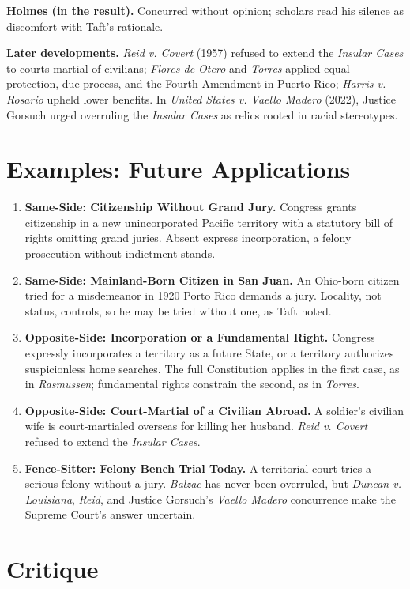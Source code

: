 \documentclass[12pt]{article}
\begin{document}
\textbf{Holmes (in the result).} Concurred without opinion; scholars read his silence as discomfort with Taft's rationale.

\textbf{Later developments.} \textit{Reid v. Covert} (1957) refused to extend the \textit{Insular Cases} to courts-martial of civilians; \textit{Flores de Otero} and \textit{Torres} applied equal protection, due process, and the Fourth Amendment in Puerto Rico; \textit{Harris v. Rosario} upheld lower benefits. In \textit{United States v. Vaello Madero} (2022), Justice Gorsuch urged overruling the \textit{Insular Cases} as relics rooted in racial stereotypes.

\section{Examples: Future Applications}

\begin{enumerate}
\item \textbf{Same-Side: Citizenship Without Grand Jury.} Congress grants citizenship in a new unincorporated Pacific territory with a statutory bill of rights omitting grand juries. Absent express incorporation, a felony prosecution without indictment stands.
\item \textbf{Same-Side: Mainland-Born Citizen in San Juan.} An Ohio-born citizen tried for a misdemeanor in 1920 Porto Rico demands a jury. Locality, not status, controls, so he may be tried without one, as Taft noted.
\item \textbf{Opposite-Side: Incorporation or a Fundamental Right.} Congress expressly incorporates a territory as a future State, or a territory authorizes suspicionless home searches. The full Constitution applies in the first case, as in \textit{Rasmussen}; fundamental rights constrain the second, as in \textit{Torres}.
\item \textbf{Opposite-Side: Court-Martial of a Civilian Abroad.} A soldier's civilian wife is court-martialed overseas for killing her husband. \textit{Reid v. Covert} refused to extend the \textit{Insular Cases}.
\item \textbf{Fence-Sitter: Felony Bench Trial Today.} A territorial court tries a serious felony without a jury. \textit{Balzac} has never been overruled, but \textit{Duncan v. Louisiana}, \textit{Reid}, and Justice Gorsuch's \textit{Vaello Madero} concurrence make the Supreme Court's answer uncertain.
\end{enumerate}

\section{Critique}
\end{document}
